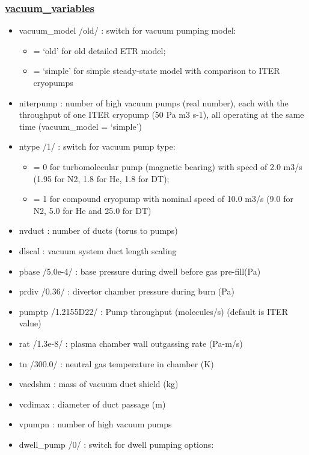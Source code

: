 \documentclass[]{article}
\providecommand{\tightlist}{%
  \setlength{\itemsep}{0pt}\setlength{\parskip}{0pt}}
\begin{document}
\subsubsection{\texorpdfstring{\href{vacuum_variables.html}{vacuum\_variables}}{vacuum\_variables}}\label{vacuum_variables}

\begin{itemize}
\item
  vacuum\_model /old/ : switch for vacuum pumping model:

  \begin{itemize}
  \tightlist
  \item
    = `old' for old detailed ETR model;
  \item
    = `simple' for simple steady-state model with comparison to ITER
    cryopumps
  \end{itemize}
\item
  niterpump : number of high vacuum pumps (real number), each with the
  throughput of one ITER cryopump (50 Pa m3 s-1), all operating at the
  same time (vacuum\_model = `simple')
\item
  ntype /1/ : switch for vacuum pump type:

  \begin{itemize}
  \tightlist
  \item
    = 0 for turbomolecular pump (magnetic bearing) with speed of 2.0
    m3/s (1.95 for N2, 1.8 for He, 1.8 for DT);
  \item
    = 1 for compound cryopump with nominal speed of 10.0 m3/s (9.0 for
    N2, 5.0 for He and 25.0 for DT)
  \end{itemize}
\item
  nvduct : number of ducts (torus to pumps)
\item
  dlscal : vacuum system duct length scaling
\item
  pbase /5.0e-4/ : base pressure during dwell before gas pre-fill(Pa)
\item
  prdiv /0.36/ : divertor chamber pressure during burn (Pa)
\item
  pumptp /1.2155D22/ : Pump throughput (molecules/s) (default is ITER
  value)
\item
  rat /1.3e-8/ : plasma chamber wall outgassing rate (Pa-m/s)
\item
  tn /300.0/ : neutral gas temperature in chamber (K)
\item
  vacdshm : mass of vacuum duct shield (kg)
\item
  vcdimax : diameter of duct passage (m)
\item
  vpumpn : number of high vacuum pumps
\item
  dwell\_pump /0/ : switch for dwell pumping options:


\end{itemize}
\end{document}
